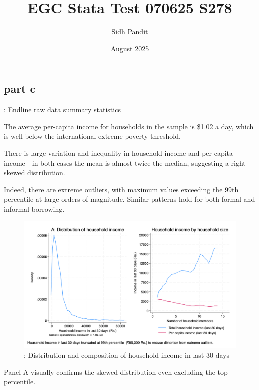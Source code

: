 \documentclass[12pt]{article}
\title{EGC Stata Test 070625 S278}
\author{Sidh Pandit}
\date{August 2025}
\begin{document}
\maketitle


\subsection{part c}

\begin{table}[H]
    \centering
    \scriptsize %
    \setlength{\tabcolsep}{2pt}
    \renewcommand{\arraystretch}{2}
    \resizebox{\textwidth}{!}{}
    \caption{: Endline raw data summary statistics}
\end{table}


The average per-capita income for households in the sample is \$1.02 a day, which is well below the international extreme poverty threshold. 

There is large variation and inequality in household income and per-capita income - in both cases the mean is almost twice the median, suggesting a right skewed distribution.

Indeed, there are extreme outliers, with maximum values exceeding the 99th percentile at large orders of magnitude. Similar patterns hold for both formal and informal borrowing.


\begin{figure}[H]
    \centering
    \includegraphics[width=\textwidth]{figures/figure01_hhinc.png}
    \caption{: Distribution and composition of household income in last 30 days}
\end{figure}

Panel A visually confirms the skewed distribution even excluding the top percentile.
\end{document}
